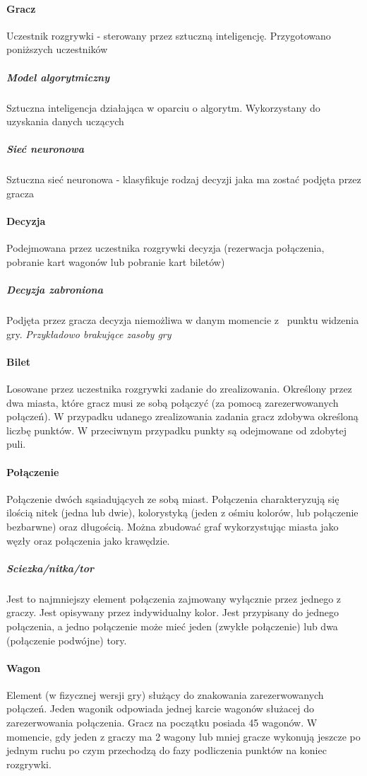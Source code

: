 \documentclass[12pt, oneside]{report}
\begin{document}
	\paragraph{Gracz}
	Uczestnik rozgrywki - sterowany przez sztuczną inteligencję. Przygotowano poniższych uczestników
	\subparagraph{Model algorytmiczny} Sztuczna inteligencja działająca w oparciu o algorytm. Wykorzystany do uzyskania danych uczących
	\subparagraph{Sieć neuronowa} Sztuczna sieć neuronowa - klasyfikuje rodzaj decyzji jaka ma zostać podjęta przez gracza
	\paragraph{Decyzja}
	Podejmowana przez uczestnika rozgrywki decyzja (rezerwacja połączenia, pobranie kart wagonów lub pobranie kart biletów)
	\subparagraph{Decyzja zabroniona}
	Podjęta przez gracza decyzja niemożliwa w danym momencie z~ punktu widzenia gry. \textit{Przykładowo brakujące zasoby gry}
	\paragraph{Bilet}
	\label{dictionary:bilet}
	Losowane przez uczestnika rozgrywki zadanie do zrealizowania. Określony przez dwa miasta, które gracz musi ze sobą połączyć (za pomocą zarezerwowanych połączeń). W przypadku udanego zrealizowania zadania gracz zdobywa określoną liczbę punktów. W przeciwnym przypadku punkty są odejmowane od zdobytej puli.
	\paragraph{Połączenie}
	Połączenie dwóch sąsiadujących ze sobą miast. Połączenia charakteryzują się ilością nitek (jedna lub dwie), kolorystyką (jeden z ośmiu kolorów, lub połączenie bezbarwne) oraz długością. Można zbudować graf wykorzystując miasta jako węzły oraz połączenia jako krawędzie.
	\subparagraph{Sciezka/nitka/tor} 
	Jest to najmniejszy element połączenia zajmowany wyłącznie przez jednego z graczy. Jest opisywany przez indywidualny kolor. Jest przypisany do jednego połączenia, a jedno połączenie może mieć jeden (zwykłe połączenie) lub dwa (połączenie podwójne) tory.
	\paragraph{Wagon} Element (w fizycznej wersji gry) służący do znakowania zarezerwowanych połączeń. Jeden wagonik odpowiada jednej karcie wagonów służacej do zarezerwowania połączenia. Gracz na początku posiada 45 wagonów. W momencie, gdy jeden z graczy ma 2 wagony lub mniej gracze wykonują jeszcze po jednym ruchu po czym przechodzą do fazy podliczenia punktów na koniec rozgrywki.
\end{document}
